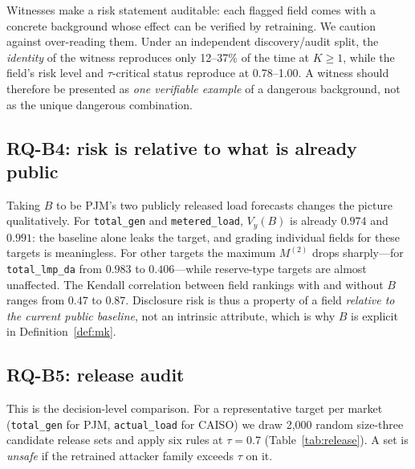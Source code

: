 \documentclass[preprint,12pt]{elsarticle}
\newcommand{\Vy}{V_{y}}
\begin{document}
Witnesses make a risk statement auditable: each flagged field comes with a concrete
background whose effect can be verified by retraining. We caution against over-reading them.
Under an independent discovery/audit split, the \emph{identity} of the witness reproduces
only 12--37\% of the time at $K\ge1$, while the field's risk level and $\tau$-critical status
reproduce at 0.78--1.00. A witness should therefore be presented as \emph{one verifiable
example} of a dangerous background, not as the unique dangerous combination.

\subsection{RQ-B4: risk is relative to what is already public}
Taking $B$ to be PJM's two publicly released load forecasts changes the picture
qualitatively. For \texttt{total\_gen} and \texttt{metered\_load}, $\Vy(B)$ is already
$0.974$ and $0.991$: the baseline alone leaks the target, and grading individual fields for
these targets is meaningless. For other targets the maximum $M^{(2)}$ drops sharply---for
\texttt{total\_lmp\_da} from $0.983$ to $0.406$---while reserve-type targets are almost
unaffected. The Kendall correlation between field rankings with and without $B$ ranges from
$0.47$ to $0.87$. Disclosure risk is thus a property of a field \emph{relative to the current
public baseline}, not an intrinsic attribute, which is why $B$ is explicit in
Definition~\ref{def:mk}.

\subsection{RQ-B5: release audit}\label{sec:release}
This is the decision-level comparison. For a representative target per market
(\texttt{total\_gen} for PJM, \texttt{actual\_load} for CAISO) we draw 2{,}000 random
size-three candidate release sets and apply six rules at $\tau=0.7$
(Table~\ref{tab:release}). A set is \emph{unsafe} if the retrained attacker family exceeds
$\tau$ on it.
\end{document}

